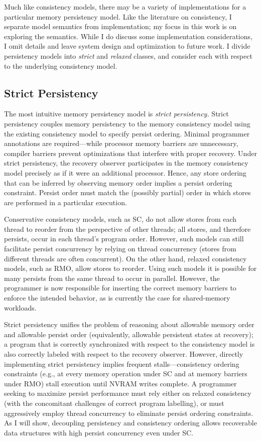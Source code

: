 Much like consistency models, there may be a variety of implementations for a particular memory persistency model.
Like the literature on consistency, I separate model semantics from implementation; my focus in this work is on exploring the semantics.
While I do discuss some implementation considerations, I omit details and leave system design and optimization to future work.
I divide persistency models into \emph{strict} and \emph{relaxed} classes, and consider each with respect to the underlying consistency model.

\subsection{Strict Persistency}

The most intuitive memory persistency model is \emph{strict persistency.}
Strict persistency couples memory persistency to the memory consistency model using the existing consistency model to specify persist ordering.
Minimal programmer annotations are required---while processor memory barriers are unnecessary, compiler barriers prevent optimizations that interfere with proper recovery.
Under strict persistency, the recovery observer participates in the memory consistency model precisely as if it were an additional processor.  
Hence, any store ordering that can be inferred by observing memory order implies a persist ordering constraint.
Persist order must match the (possibly partial) order in which stores are performed in a particular execution.
 
Conservative consistency models, such as SC, do not allow stores from each thread to reorder from the perspective of other threads; all stores, and therefore persists, occur in each thread's program order.
However, such models can still facilitate persist concurrency by relying on thread concurrency (stores from different threads are often concurrent).
On the other hand, relaxed consistency models, such as RMO, allow stores to reorder.
Using such models it is possible for many persists from the same thread to occur in parallel.
However, the programmer is now responsible for inserting the correct memory barriers to enforce the intended behavior, as is currently the case for shared-memory workloads.

Strict persistency unifies the problem of reasoning about allowable memory order and allowable persist order (equivalently, allowable persistent states at recovery); a program that is correctly synchronized with respect to the consistency model is also correctly labeled with respect to the recovery observer.
However, directly implementing strict persistency implies frequent stalls---consistency ordering constraints (e.g., at every memory operation under SC and at memory barriers under RMO) stall execution until NVRAM writes complete. 
A programmer seeking to maximize persist performance must rely either on relaxed consistency (with the concomitant challenges of correct program labelling), or must aggressively employ thread concurrency to eliminate persist ordering constraints.
As I will show, decoupling persistency and consistency ordering allows recoverable data structures with high persist concurrency even under SC.

